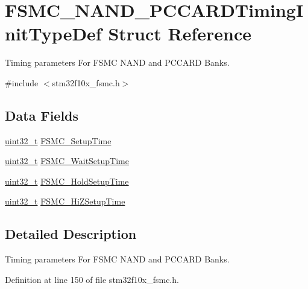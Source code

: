 \hypertarget{struct_f_s_m_c___n_a_n_d___p_c_c_a_r_d_timing_init_type_def}{\section{F\-S\-M\-C\-\_\-\-N\-A\-N\-D\-\_\-\-P\-C\-C\-A\-R\-D\-Timing\-Init\-Type\-Def Struct Reference}
\label{struct_f_s_m_c___n_a_n_d___p_c_c_a_r_d_timing_init_type_def}
}


Timing parameters For F\-S\-M\-C N\-A\-N\-D and P\-C\-C\-A\-R\-D Banks.  




{\ttfamily \#include $<$stm32f10x\-\_\-fsmc.\-h$>$}

\subsection*{Data Fields}
\begin{DoxyCompactItemize}
\item 
\hyperlink{stdint_8h_a435d1572bf3f880d55459d9805097f62}{uint32\-\_\-t} \hyperlink{struct_f_s_m_c___n_a_n_d___p_c_c_a_r_d_timing_init_type_def_a31632aeb49269a29a39e3b191590b6dc}{F\-S\-M\-C\-\_\-\-Setup\-Time}
\item 
\hyperlink{stdint_8h_a435d1572bf3f880d55459d9805097f62}{uint32\-\_\-t} \hyperlink{struct_f_s_m_c___n_a_n_d___p_c_c_a_r_d_timing_init_type_def_a99a7d54ed2674faa5a4e0f2669812855}{F\-S\-M\-C\-\_\-\-Wait\-Setup\-Time}
\item 
\hyperlink{stdint_8h_a435d1572bf3f880d55459d9805097f62}{uint32\-\_\-t} \hyperlink{struct_f_s_m_c___n_a_n_d___p_c_c_a_r_d_timing_init_type_def_ae2b53c2cfd55ff277f453613dcf7c8b2}{F\-S\-M\-C\-\_\-\-Hold\-Setup\-Time}
\item 
\hyperlink{stdint_8h_a435d1572bf3f880d55459d9805097f62}{uint32\-\_\-t} \hyperlink{struct_f_s_m_c___n_a_n_d___p_c_c_a_r_d_timing_init_type_def_a8a2a2a9e71dbf276fddad2bb32c0d256}{F\-S\-M\-C\-\_\-\-Hi\-Z\-Setup\-Time}
\end{DoxyCompactItemize}


\subsection{Detailed Description}
Timing parameters For F\-S\-M\-C N\-A\-N\-D and P\-C\-C\-A\-R\-D Banks. 

Definition at line 150 of file stm32f10x\-\_\-fsmc.\-h.



